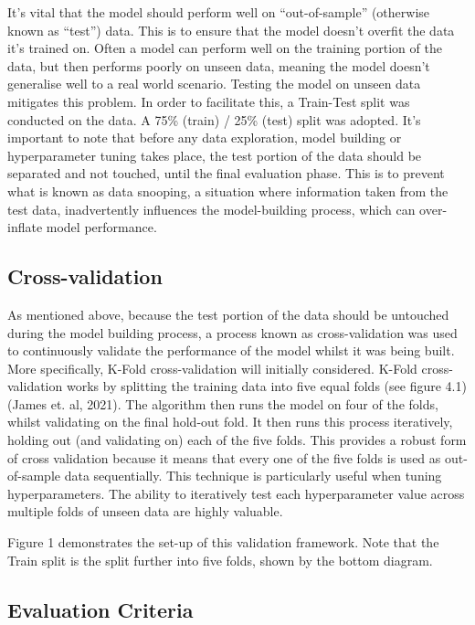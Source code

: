 \documentclass[11pt, a4paper]{article}
\begin{document}
It’s vital that the model should perform well on “out-of-sample” (otherwise known as “test”) data. This is to ensure that the model doesn’t overfit the data it’s trained on. Often a model can perform well on the training portion of the data, but then performs poorly on unseen data, meaning the model doesn’t generalise well to a real world scenario. Testing the model on unseen data mitigates this problem. In order to facilitate this, a Train-Test split was conducted on the data. A 75\% (train) / 25\% (test) split was adopted. It’s important to note that before any data exploration, model building or hyperparameter tuning takes place, the test portion of the data should be separated and not touched, until the final evaluation phase. This is to prevent what is known as data snooping, a situation where information taken from the test data, inadvertently influences the model-building process, which can over-inflate model performance. 

\subsection{Cross-validation}

As mentioned above, because the test portion of the data should be untouched during the model building process, a process known as cross-validation was used to continuously validate the performance of the model whilst it was being built. More specifically, K-Fold cross-validation will initially considered. K-Fold cross-validation works by splitting the training data into five equal folds (see figure 4.1) (James et. al, 2021). The algorithm then runs the model on four of the folds, whilst validating on the final hold-out fold. It then runs this process iteratively, holding out (and validating on) each of the five folds. This provides a robust form of cross validation because it means that every one of the five folds is used as out-of-sample data sequentially. This technique is particularly useful when tuning hyperparameters. The ability to iteratively test each hyperparameter value across multiple folds of unseen data are highly valuable. 

Figure 1 demonstrates the set-up of this validation framework. Note that the Train split is the split further into five folds, shown by the bottom diagram. 

\subsection{Evaluation Criteria}
\end{document}
